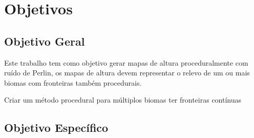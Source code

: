 \chapter{Objetivos}

\section{Objetivo Geral}
Este trabalho tem como objetivo gerar mapas de altura proceduralmente com ruído 
de Perlin, os mapas de altura devem representar o relevo de um ou mais biomas
com fronteiras também procedurais.

Criar um método procedural para múltiplos biomas ter fronteiras contínuas

\section{Objetivo Específico}




